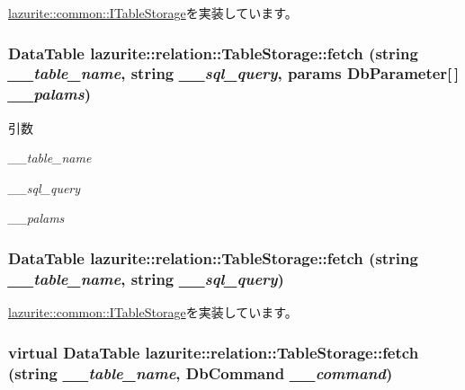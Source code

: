 \hyperlink{interfacelazurite_1_1common_1_1_i_table_storage_a2645db3c1b04ecd4e76f00edaf65ba03}{lazurite::common::ITableStorage}を実装しています。\hypertarget{classlazurite_1_1relation_1_1_table_storage_a32ad75f76cbf4ec2b89e86097fc35163}{
\subsubsection[{fetch}]{\setlength{\rightskip}{0pt plus 5cm}DataTable lazurite::relation::TableStorage::fetch (string {\em \_\-\_\-table\_\-name}, \/  string {\em \_\-\_\-sql\_\-query}, \/  params DbParameter\mbox{[}$\,$\mbox{]} {\em \_\-\_\-palams})}}
\label{classlazurite_1_1relation_1_1_table_storage_a32ad75f76cbf4ec2b89e86097fc35163}

\begin{DoxyParams}{引数}
\item[{\em \_\-\_\-table\_\-name}]\item[{\em \_\-\_\-sql\_\-query}]\item[{\em \_\-\_\-palams}]\end{DoxyParams}
\hypertarget{classlazurite_1_1relation_1_1_table_storage_a1de112fe907e377581cea36721cf88c3}{
\subsubsection[{fetch}]{\setlength{\rightskip}{0pt plus 5cm}DataTable lazurite::relation::TableStorage::fetch (string {\em \_\-\_\-table\_\-name}, \/  string {\em \_\-\_\-sql\_\-query})}}
\label{classlazurite_1_1relation_1_1_table_storage_a1de112fe907e377581cea36721cf88c3}


\hyperlink{interfacelazurite_1_1common_1_1_i_table_storage_a2607a18e5f7931dfc5ecacbc21f077e3}{lazurite::common::ITableStorage}を実装しています。\hypertarget{classlazurite_1_1relation_1_1_table_storage_a0e234b13cc79ab830d45d4e78a6fb8c7}{
\subsubsection[{fetch}]{\setlength{\rightskip}{0pt plus 5cm}virtual DataTable lazurite::relation::TableStorage::fetch (string {\em \_\-\_\-table\_\-name}, \/  DbCommand {\em \_\-\_\-command})}}
\label{classlazurite_1_1relation_1_1_table_storage_a0e234b13cc79ab830d45d4e78a6fb8c7}

